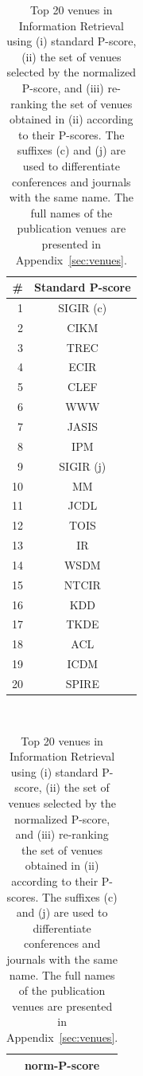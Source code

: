 \documentclass[msc]{ppgccufmg}
\begin{document}
\begin{table}[htbp]
\centering
\caption{Top 20 venues in Information Retrieval using (i) standard P-score, (ii) the set of venues selected by the normalized P-score, and (iii) re-ranking the set of venues obtained in (ii) according to their P-scores. The suffixes (c) and (j) are used to differentiate conferences and journals with the same name. The full names of the publication venues are presented in Appendix~\ref{sec:venues}.}
\label{tab:ir-venues}
\begin{tabular}{rc}
\toprule
\#		&	Standard P-score \\ 
\midrule
1		&	SIGIR (c) \\
2		&	CIKM		\\
3		&	TREC	\\	
4		&	ECIR		\\
5		&	CLEF		\\
6		&	WWW	\\		
7		&	JASIS	\\	
8		&	IPM		\\	
9		&	SIGIR (j) \\
10		&	MM	\\		
11		&	JCDL		\\
12		&	TOIS		\\
13		&	IR			\\
14		&	WSDM	\\
15		&	NTCIR	\\
16		&	KDD		\\
17		&	TKDE	\\
18		&	ACL		\\
19		&	ICDM		\\
20		&	SPIRE	\\
\bottomrule
\end{tabular} \ \ 
\begin{tabular}{c}
\toprule
norm-P-score \\ 
\midrule

\end{tabular}
\end{table}
\end{document}

